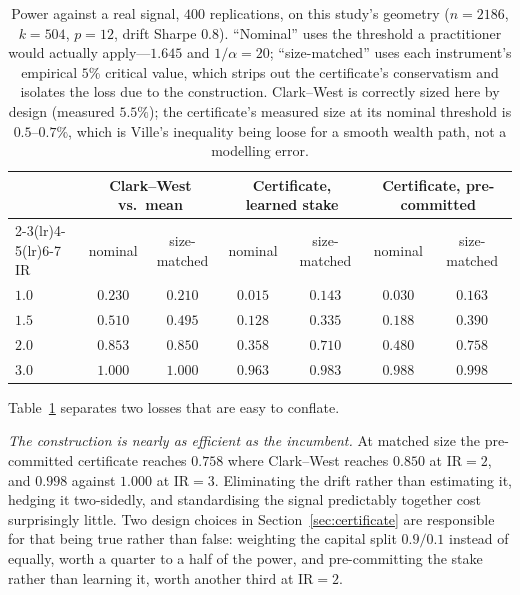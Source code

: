 \documentclass{article}
\theoremstyle{plain}
\theoremstyle{definition}
\begin{document}
\begin{table}[t]
  \centering
  \caption{Power against a real signal, $400$ replications, on this study's geometry
  ($n=2186$, $k=504$, $p=12$, drift Sharpe $0.8$). ``Nominal'' uses the threshold a
  practitioner would actually apply---$1.645$ and $1/\alpha=20$; ``size-matched'' uses each
  instrument's empirical $5\%$ critical value, which strips out the certificate's
  conservatism and isolates the loss due to the construction. Clark--West is correctly sized
  here by design (measured $5.5\%$); the certificate's measured size at its nominal threshold
  is $0.5$--$0.7\%$, which is Ville's inequality being loose for a smooth wealth path, not a
  modelling error.}
  \label{tab:headtohead}
  \small
  \begin{tabular}{lcccccc}
    \toprule
    & \multicolumn{2}{c}{Clark--West vs.\ mean}
    & \multicolumn{2}{c}{Certificate, learned stake}
    & \multicolumn{2}{c}{Certificate, pre-committed} \\
    \cmidrule(lr){2-3}\cmidrule(lr){4-5}\cmidrule(lr){6-7}
    $\mathrm{IR}$ & nominal & size-matched & nominal & size-matched & nominal & size-matched \\
    \midrule
    $1.0$ & $0.230$ & $0.210$ & $0.015$ & $0.143$ & $0.030$ & $0.163$ \\
    $1.5$ & $0.510$ & $0.495$ & $0.128$ & $0.335$ & $0.188$ & $0.390$ \\
    $2.0$ & $0.853$ & $0.850$ & $0.358$ & $0.710$ & $0.480$ & $0.758$ \\
    $3.0$ & $1.000$ & $1.000$ & $0.963$ & $0.983$ & $0.988$ & $0.998$ \\
    \bottomrule
  \end{tabular}
\end{table}

Table~\ref{tab:headtohead} separates two losses that are easy to conflate.

\emph{The construction is nearly as efficient as the incumbent.} At matched size the
pre-committed certificate reaches $0.758$ where Clark--West reaches $0.850$ at
$\mathrm{IR}=2$, and $0.998$ against $1.000$ at $\mathrm{IR}=3$. Eliminating the drift rather
than estimating it, hedging it two-sidedly, and standardising the signal predictably together
cost surprisingly little. Two design choices in Section~\ref{sec:certificate} are responsible
for that being true rather than false: weighting the capital split $0.9/0.1$ instead of
equally, worth a quarter to a half of the power, and pre-committing the stake rather than
learning it, worth another third at $\mathrm{IR}=2$.
\end{document}
